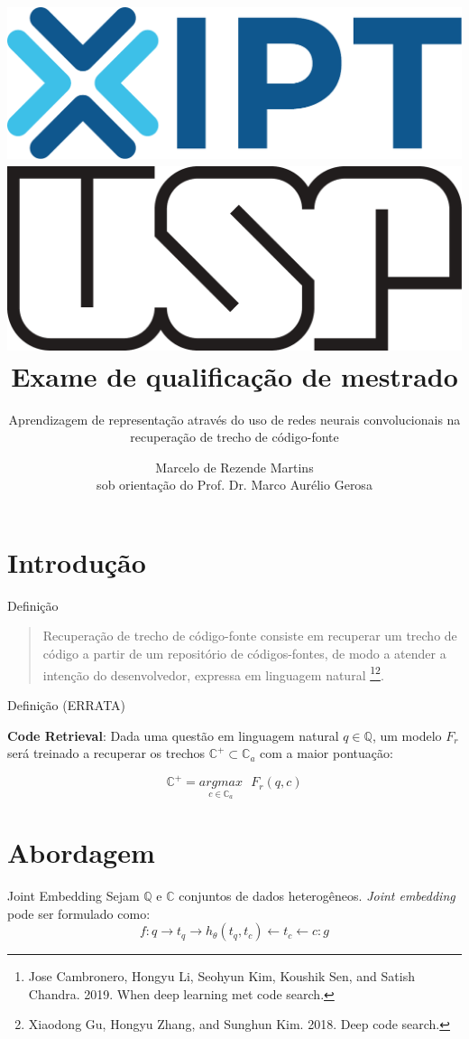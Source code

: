 \documentclass[10pt]{beamer}
\title{\includegraphics[scale=0.15]{figuras/logo-ipt.pdf} \hfill \includegraphics[scale=0.1]{figuras/usp-logo.pdf}\\Exame de qualificação de mestrado}
\subtitle{Aprendizagem de representação através do uso de redes neurais convolucionais na recuperação de trecho de código-fonte}
\date{}
\author{Marcelo de Rezende Martins\\{\footnotesize sob orientação do Prof. Dr. Marco Aurélio Gerosa}}
\institute{Instituto de Pesquisas Tecnológicas do Estado de São Paulo - IPT}
\begin{document}
\maketitle



\section[Intro]{Introdução}


\begin{frame}[fragile]{Definição}

\begin{quote}
Recuperação de trecho de código-fonte consiste em recuperar um trecho de código a partir de um repositório de códigos-fontes, de modo a atender a intenção do desenvolvedor, expressa em linguagem natural \footnote{Jose Cambronero, Hongyu Li, Seohyun Kim, Koushik Sen, and Satish Chandra. 2019. When deep learning met code search.}\footnote{Xiaodong Gu, Hongyu Zhang, and Sunghun Kim. 2018. Deep code search.}.     
\end{quote}


\end{frame}
\begin{frame}[fragile]{Definição (ERRATA)}

  \textbf{Code Retrieval}: Dada uma questão em linguagem natural $q \in \mathbb{Q}$, um modelo $F_{r}$ será treinado a recuperar os trechos $\mathbb{C}^{+} \subset \mathbb{C}_{a}$ com a maior pontuação:

\begin{equation}\label{eq:code-retrieval}
\mathbb{C}^{+} = \underset{c \in \mathbb{C}_{a}}{argmax}\text{ } F_{r}(q , c)
\end{equation}
\end{frame}


\section{Abordagem}

\begin{frame}{Joint Embedding}
    Sejam $\mathbb{Q}$ e $\mathbb{C}$ conjuntos de dados heterogêneos. \textit{Joint embedding} pode ser formulado como:
	\begin{equation}
        f: q \rightarrow t_{q} \rightarrow h_{\theta}(t_{q}, t_{c}) \leftarrow t_{c} \leftarrow c :g
    \end{equation}
\end{frame}
\end{document}

